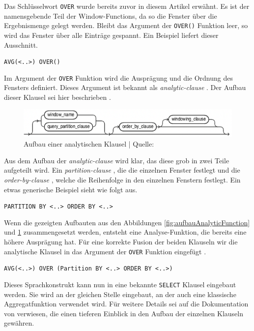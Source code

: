 Das Schlüsselwort \texttt{OVER} wurde bereits zuvor in diesem Artikel erwähnt. Es
ist der namensgebende Teil der Window-Functions, da so die Fenster über die
Ergebnismenge gelegt werden. Bleibt das Argument der \texttt{OVER()} Funktion
leer, so wird das Fenster über alle Einträge gespannt. Ein Beispiel liefert
dieser Ausschnitt.

\texttt{AVG(<..>) OVER()} \citep{Nuijten2023}

Im Argument der \texttt{OVER} Funktion wird die Ausprägung und die Ordnung des
Fensters definiert. Dieses Argument ist bekannt als \textit{analytic-clause}
\citep{oracle}. Der Aufbau dieser Klausel sei hier beschrieben \citep{oracle}.
\begin{figure}[h]
	\centering
	\includegraphics[scale=0.5]{img/aufbauAnalyticClausel.jpg}
	\caption{ Aufbau einer analytischen Klausel | Quelle: \citep{oracle}}
	\label{fig:aufbauAnalytischeKlausel}
\end{figure}
Aus dem Aufbau der \textit{analytic-clause} \citep{oracle} wird klar, das diese grob
in zwei Teile aufgeteilt wird. Ein \textit{partition-clause} \citep{oracle}, die
die einzelnen Fenster festlegt und die \textit{order-by-clause} \citep{oracle},
welche die Reihenfolge in den einzelnen Fenstern festlegt. Ein etwas generische Beispiel
sieht wie folgt aus.

\texttt{PARTITION BY <..> ORDER BY <..>} \\ \citep[Analytic Functions]{Nuijten2023}

Wenn die gezeigten Aufbauten aus den Abbildungen \ref{fig:aufbauAnalyticFunction}
und \ref{fig:aufbauAnalytischeKlausel} zusammengesetzt werden, entsteht eine
Analyse-Funktion, die bereits eine höhere Ausprägung hat. Für eine korrekte
Fusion der beiden Klauseln wir die analytische Klausel in das Argument der
\texttt{OVER} Funktion eingefügt \citep[Analytic Functions]{Nuijten2023}.

\texttt{AVG(<..>) OVER (Partition BY <..> ORDER BY <..>)} \\ \citep[Analytic
Functions]{Nuijten2023}

Dieses Sprachkonstrukt kann nun in eine bekannte \texttt{SELECT} Klausel
eingebaut werden. Sie wird an der gleichen Stelle eingebaut, an der auch eine
klassische Aggregatfunktion verwendet wird. Für weitere Details sei auf die Dokumentation
von \citet{oracle} verwiesen, die einen tieferen Einblick in den Aufbau der einzelnen
Klauseln gewähren.

